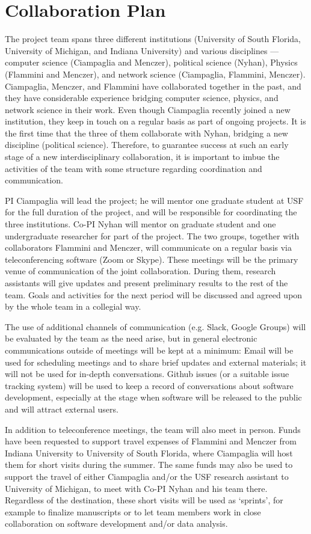 \section*{Collaboration Plan}

The project team spans three different institutions (University of South Florida, University of Michigan, and Indiana University) and various disciplines --- computer science (Ciampaglia and Menczer), political science (Nyhan), Physics (Flammini and Menczer), and network science (Ciampaglia, Flammini, Menczer). Ciampaglia, Menczer, and Flammini have collaborated together in the past, and they have considerable experience bridging computer science, physics, and network science in their work. Even though Ciampaglia recently joined a new institution, they keep in touch on a regular basis as part of ongoing projects. It is the first time that the three of them collaborate with Nyhan, bridging a new discipline (political science). Therefore, to guarantee success at such an early stage of a new interdisciplinary collaboration, it is important to imbue the activities of the team with some structure regarding coordination and communication. 

PI Ciampaglia will lead the project; he will mentor one graduate student at USF for the full duration of the project, and will be responsible for coordinating the three institutions. Co-PI Nyhan will mentor on graduate student and one undergraduate researcher for part of the project. The two groups, together with collaborators Flammini and Menczer, will communicate on a regular basis via teleconferencing software (Zoom or Skype). These meetings will be the primary venue of communication of the joint collaboration. During them, research assistants will give updates and present preliminary results to the rest of the team. Goals and activities for the next period will be discussed and agreed upon by the whole team in a collegial way.

The use of additional channels of communication (e.g. Slack, Google Groups) will be evaluated by the team as the need arise, but in general electronic communications outside of meetings will be kept at a minimum: Email will be used for scheduling meetings and to share brief updates and external materials; it will not be used for in-depth conversations. Github issues (or a suitable issue tracking system) will be used to keep a record of conversations about software development, especially at the stage when software will be released to the public and will attract external users.

In addition to teleconference meetings, the team will also meet in person. Funds have been requested to support travel expenses of Flammini and Menczer from Indiana University to University of South Florida, where Ciampaglia will host them for short visits during the summer. The same funds may also be used to support the travel of either Ciampaglia and/or the USF research assistant to University of Michigan, to meet with Co-PI Nyhan and his team there. Regardless of the destination, these short visits will be used as `sprints', for example to finalize manuscripts or to let team members work in close collaboration on software development and/or data analysis.